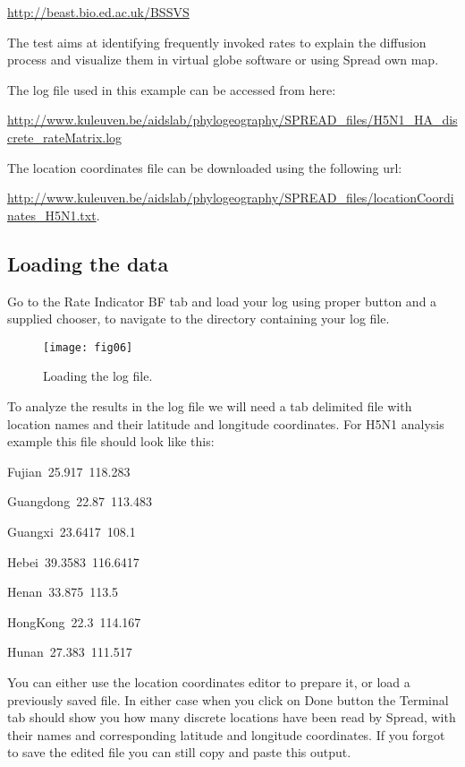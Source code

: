 \url{http://beast.bio.ed.ac.uk/BSSVS} 

\noindent
The test aims at identifying frequently invoked rates to explain the
diffusion process and visualize them in virtual globe software or
using Spread own map. 

\noindent
The log file used in this example can be accessed from here:

\url{http://www.kuleuven.be/aidslab/phylogeography/SPREAD_files/H5N1_HA_discrete_rateMatrix.log}

\noindent
The location coordinates file can be downloaded using the following
url: 

\url{http://www.kuleuven.be/aidslab/phylogeography/SPREAD_files/locationCoordinates_H5N1.txt}.


\subsection{Loading the data}

Go to the Rate Indicator BF tab and load your log using proper button
and a supplied chooser, to navigate to the directory containing your
log file. 

\begin{figure}[H]
\begin{centering}
\texttt{[image: fig06]}
\caption{Loading the log file.}
\label{fig:06}
\par\end{centering}
\end{figure}

To analyze the results in the log file we will need a tab delimited
file with location names and their latitude and longitude coordinates.
For H5N1 analysis example this file should look like this:

\begin{lyxcode}
Fujian~25.917~118.283

Guangdong~22.87~113.483

Guangxi~23.6417~108.1

Hebei~39.3583~116.6417

Henan~33.875~113.5

HongKong~22.3~114.167

Hunan~27.383~111.517
\end{lyxcode}

You can either use the location coordinates editor to prepare it,
or load a previously saved file. In either case when you click on
Done button the Terminal tab should show you how many discrete locations
have been read by Spread, with their names and corresponding latitude
and longitude coordinates. If you forgot to save the edited file you
can still copy and paste this output.

